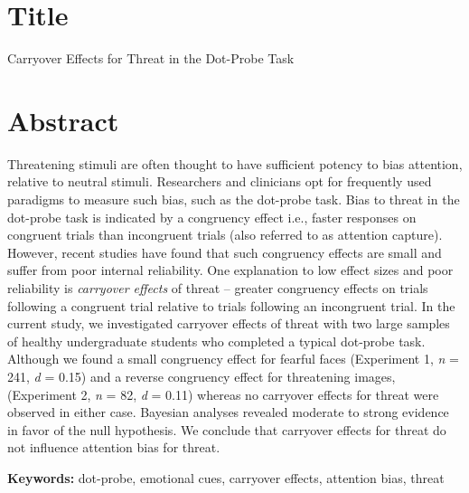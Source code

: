 \documentclass{article}
\begin{document}
	\section{Title}



	{\color{4472C4}Carryover Effects for Threat in the Dot-Probe Task}







	\section{Abstract}



	Threatening stimuli are often thought to have sufficient potency to bias attention, relative to neutral stimuli. Researchers and clinicians opt for frequently used paradigms to measure such bias, such as the dot-probe task. Bias to threat in the dot-probe task is indicated by a congruency effect i.e., faster responses on congruent trials than incongruent trials (also referred to as attention capture). However, recent studies have found that such congruency effects are small and suffer from poor internal reliability. One explanation to low effect sizes and poor reliability is \emph{carryover effects} of threat – greater congruency effects on trials {\color{4472C4}following }a congruent trial relative to trials following an incongruent trial. In the current study, we investigated carryover effects of threat with two large samples of healthy undergraduate students who completed a typical dot-probe task. Although we found a small congruency effect for fearful faces (Experiment 1, \emph{n} = 241, \emph{d }= 0.15) and a reverse congruency effect for threatening images, (Experiment 2, \emph{n }= 82, \emph{d }= 0.11) whereas no carryover effects for threat were observed in either case. Bayesian analyses revealed moderate to strong evidence in favor of the null hypothesis. We conclude that carryover effects for threat do not influence attention bias for threat.







	\textbf{Keywords:} dot-probe, emotional cues, carryover effects, attention bias, threat
\end{document}

